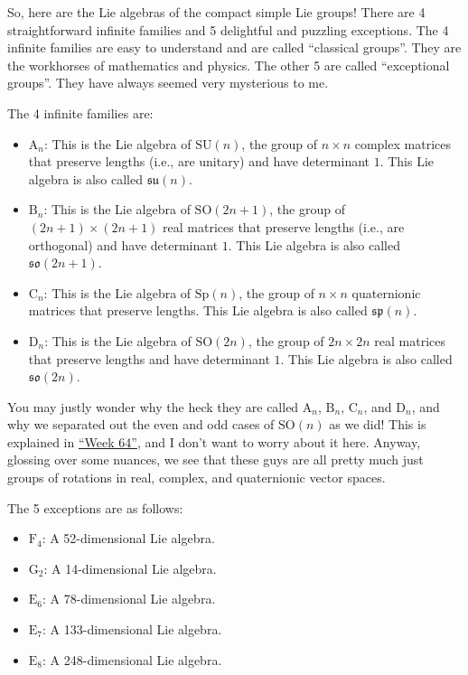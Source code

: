 \documentclass{article}
\def\tightlist{}
\begin{document}
So, here are the Lie algebras of the compact simple Lie groups! There
are 4 straightforward infinite families and 5 delightful and puzzling
exceptions. The 4 infinite families are easy to understand and are
called ``classical groups''. They are the workhorses of mathematics and
physics. The other 5 are called ``exceptional groups''. They have always
seemed very mysterious to me.

The 4 infinite families are:

\begin{itemize}
\tightlist
\item
  \(\mathrm{A}_n\): This is the Lie algebra of \(\mathrm{SU}(n)\), the
  group of \(n\times n\) complex matrices that preserve lengths (i.e.,
  are unitary) and have determinant \(1\). This Lie algebra is also
  called \(\mathfrak{su}(n)\).
\item
  \(\mathrm{B}_n\): This is the Lie algebra of \(\mathrm{SO}(2n+1)\),
  the group of \((2n+1)\times(2n+1)\) real matrices that preserve
  lengths (i.e., are orthogonal) and have determinant \(1\). This Lie
  algebra is also called \(\mathfrak{so}(2n+1)\).
\item
  \(\mathrm{C}_n\): This is the Lie algebra of \(\mathrm{Sp}(n)\), the
  group of \(n\times n\) quaternionic matrices that preserve lengths.
  This Lie algebra is also called \(\mathfrak{sp}(n)\).
\item
  \(\mathrm{D}_n\): This is the Lie algebra of \(\mathrm{SO}(2n)\), the
  group of \(2n\times 2n\) real matrices that preserve lengths and have
  determinant \(1\). This Lie algebra is also called
  \(\mathfrak{so}(2n)\).
\end{itemize}

You may justly wonder why the heck they are called \(\mathrm{A}_n\),
\(\mathrm{B}_n\), \(\mathrm{C}_n\), and \(\mathrm{D}_n\), and why we
separated out the even and odd cases of \(\mathrm{SO}(n)\) as we did!
This is explained in \protect\hyperlink{week64}{``Week 64''}, and I
don't want to worry about it here. Anyway, glossing over some nuances,
we see that these guys are all pretty much just groups of rotations in
real, complex, and quaternionic vector spaces.

The 5 exceptions are as follows:

\begin{itemize}
\tightlist
\item
  \(\mathrm{F}_4\): A 52-dimensional Lie algebra.
\item
  \(\mathrm{G}_2\): A 14-dimensional Lie algebra.
\item
  \(\mathrm{E}_6\): A 78-dimensional Lie algebra.
\item
  \(\mathrm{E}_7\): A 133-dimensional Lie algebra.
\item
  \(\mathrm{E}_8\): A 248-dimensional Lie algebra.
\end{itemize}
\end{document}
